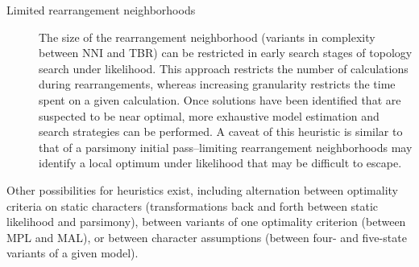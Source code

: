 \begin{description}
\item[Limited rearrangement neighborhoods] The size of the rearrangement
neighborhood (variants in complexity between NNI and TBR) can be
restricted in early search stages of topology search under likelihood.
This approach restricts the number of calculations during rearrangements,
whereas increasing granularity restricts the time spent on a given
calculation. Once solutions have been identified that are suspected
to be near optimal, more exhaustive model estimation and search
strategies can be performed. A caveat of this heuristic is similar
to that of a parsimony initial pass--limiting rearrangement
neighborhoods may identify a local optimum under likelihood that
may be difficult to escape.

\end{description}
Other possibilities for heuristics exist, including alternation
between optimality criteria on static characters (transformations
back and forth between static likelihood and parsimony), between
variants of one optimality criterion (between MPL and MAL), or
between character assumptions (between four- and five-state variants
of a given model).  




